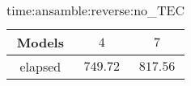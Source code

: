\begin{table}[!ht]
	\centering
	\begin{tabular}{|c|c|c|}
		\hline
		Models & $4$ & $7$ \\ \hline
		elapsed & $749.72$ & $817.56$ \\ \hline
	\end{tabular}
	\caption{time:ansamble:reverse:no_TEC}
	\label{tab:time:ansamble:reverse:no_TEC}
\end{table}
